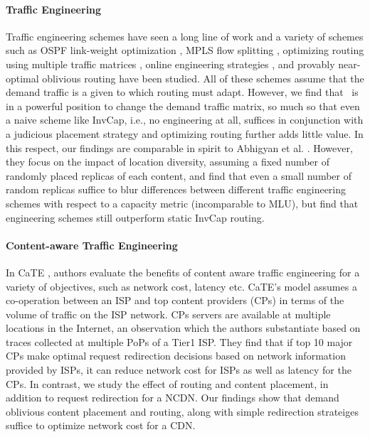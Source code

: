 {\paragraph{Traffic Engineering}  Traffic engineering schemes have seen a long line of work and a variety of schemes such as OSPF link-weight optimization \cite{fortz2000internet}, MPLS flow splitting \cite{MPLS2},  optimizing routing using multiple traffic matrices \cite{COPE, multiTM}, online engineering strategies \cite{TEXCP,MPLS2}, and provably near-optimal oblivious routing \cite{Cohen,Racke} have been studied. All of these schemes assume that the demand traffic is a given to which routing must adapt. However, we find that \ancp\ is in a powerful position to change the demand traffic matrix, so much so that even a naive scheme like InvCap, i.e., no engineering at all, suffices in conjunction with a judicious placement strategy and optimizing routing further adds little value. In this respect, our findings are comparable in spirit to Abhigyan et al. \cite{Abhigyan}. However, they focus on the impact of location diversity, assuming a fixed number of randomly placed replicas of each content, and find that even a small number of random replicas suffice to  blur differences between different traffic engineering schemes with respect to a capacity metric (incomparable to MLU), but find that engineering schemes still outperform static InvCap routing. 


\eat
{
\paragraph{Content-aware Traffic Engineering} 

In CaTE \cite{CATE}, authors evaluate the benefits of content aware traffic engineering for a variety of objectives, such as network cost, latency etc. CaTE's model assumes a co-operation between an ISP and top content providers (CPs) in terms of the volume of traffic on the ISP network. CPs servers are available at multiple locations in the Internet, an observation which the authors substantiate based on traces collected at multiple PoPs of a Tier1 ISP.  They find that if top 10 major CPs make optimal request redirection decisions based on network information provided by ISPs, it can reduce network cost for ISPs as well as latency for the CPs.  In contrast, we study the effect of routing and content placement, in addition to request redirection for a NCDN. Our findings show that demand oblivious content placement and routing, along with simple redirection strateiges suffice to optimize network cost for a CDN. 

}}
